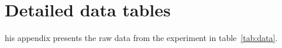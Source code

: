 \chapter{Detailed data tables}
\label{app:app01}

his appendix presents the raw data from the experiment in table~\ref{tab:data}.





\
